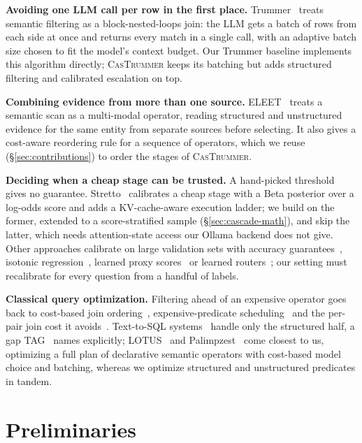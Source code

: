 \documentclass[sigconf]{acmart}
\begin{document}
\textbf{Avoiding one LLM call per row in the first place.} Trummer~\cite{trummer2025semanticjoin} treats semantic filtering as a block-nested-loops join: the LLM gets a batch of rows from each side at once and returns every match in a single call, with an adaptive batch size chosen to fit the model's context budget. Our Trummer baseline implements this algorithm directly; \textsc{CasTrummer} keeps its batching but adds structured filtering and calibrated escalation on top.

\textbf{Combining evidence from more than one source.}
ELEET~\cite{urban2024eleet} treats a semantic scan as a multi-modal operator, reading structured and unstructured evidence for the same entity from separate sources before selecting. It also gives a cost-aware reordering rule for a sequence of operators, which we reuse (\S\ref{sec:contributions}) to order the stages of \textsc{CasTrummer}.

\textbf{Deciding when a cheap stage can be trusted.} A hand-picked threshold gives no guarantee. Stretto~\cite{sanmartino2025stretto} calibrates a cheap stage with a Beta posterior over a log-odds score and adds a KV-cache-aware execution ladder; we build on the former, extended to a score-stratified sample (\S\ref{sec:cascade-math}), and skip the latter, which needs attention-state access our Ollama backend does not give. Other approaches calibrate on large validation sets with accuracy guarantees~\cite{zeighami2026bargain}, isotonic regression~\cite{kotte2026ucci}, learned proxy scores~\cite{zhang2025scaledoc} or learned routers~\cite{chen2023frugalgpt}; our setting must recalibrate for every question from a handful of labels.

\textbf{Classical query optimization.} Filtering ahead of an expensive operator goes back to cost-based join ordering~\cite{selinger1979access}, expensive-predicate scheduling~\cite{hellerstein1993predicate,hellerstein1998optimization,chaudhuri1996optimization} and the per-pair join cost it avoids~\cite{mishra1992join}. Text-to-SQL systems~\cite{gao2023textosql} handle only the structured half, a gap TAG~\cite{biswal2024tag} names explicitly; LOTUS~\cite{patel2024lotus} and Palimpzest~\cite{liu2024palimpzest} come closest to us, optimizing a full plan of declarative semantic operators with cost-based model choice and batching, whereas we optimize structured and unstructured predicates in tandem.

\section{Preliminaries}
\label{sec:prelim}
\end{document}
